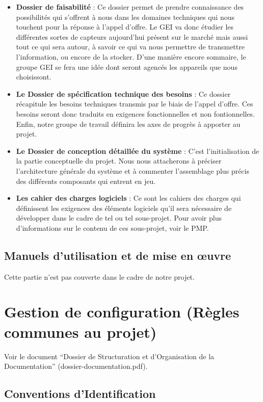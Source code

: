 \documentclass[a4paper]{article}
\begin{document}
\begin{itemize}
\item \textbf{Dossier de faisabilité} : Ce dossier permet de prendre connaissance des possibilités qui s'offrent à nous dans les domaines techniques qui nous touchent pour la réponse à l'appel d'offre. Le GEI va donc étudier les différentes sortes de capteurs aujourd'hui présent sur le marché mais aussi tout ce qui sera autour, à savoir ce qui va nous permettre de transmettre l'information, ou encore de la stocker. D'une manière encore sommaire, le groupe GEI se fera une idée dont seront agencés les appareils que nous choisissont.
\item \textbf{Le Dossier de spécification technique des besoins} : Ce dossier récapitule les besoins techniques transmis par le biais de l'appel d'offre. Ces besoins seront donc traduits en exigences fonctionnelles et non fontionnelles. Enfin, notre groupe de travail définira les axes de progrès à apporter au projet.
\item \textbf{Le Dossier de conception détaillée du système} :  C'est l'initialisation de la partie conceptuelle du projet. Nous nous attacherons à préciser l'architecture générale du système et à commenter l'assemblage plus précis des différents composants qui entrent en jeu.
\item \textbf{Les cahier des charges logiciels} :  Ce sont les cahiers des charges qui définissent les exigences des éléments logiciels qu'il sera nécessaire de développer dans le cadre de tel ou tel sous-projet. Pour avoir plus d'informations sur le contenu de ces sous-projet, voir le PMP.
\end{itemize}

\subsection{Manuels d'utilisation et de mise en œuvre}
Cette partie n'est pas couverte dans le cadre de notre projet.

\section{Gestion de configuration (Règles communes au projet)}

Voir le document ``Dossier de Structuration et d'Organisation de la Documentation'' (dossier-documentation.pdf).

\subsection{Conventions d'Identification}
\end{document}
